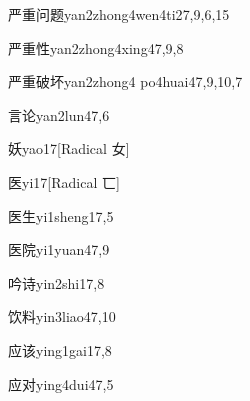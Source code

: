 \begin{verbete}{严重问题}{yan2zhong4wen4ti2}{7,9,6,15}
\end{verbete}

\begin{verbete}{严重性}{yan2zhong4xing4}{7,9,8}
\end{verbete}

\begin{verbete}{严重破坏}{yan2zhong4 po4huai4}{7,9,10,7}
\end{verbete}

\begin{verbete}{言论}{yan2lun4}{7,6}
\end{verbete}

\begin{verbete}{妖}{yao1}{7}[Radical 女]
\end{verbete}

\begin{verbete}{医}{yi1}{7}[Radical 匸]
\end{verbete}

\begin{verbete}{医生}{yi1sheng1}{7,5}
\end{verbete}

\begin{verbete}{医院}{yi1yuan4}{7,9}
\end{verbete}

\begin{verbete}{吟诗}{yin2shi1}{7,8}
\end{verbete}

\begin{verbete}{饮料}{yin3liao4}{7,10}
\end{verbete}

\begin{verbete}{应该}{ying1gai1}{7,8}
\end{verbete}

\begin{verbete}{应对}{ying4dui4}{7,5}
\end{verbete}

